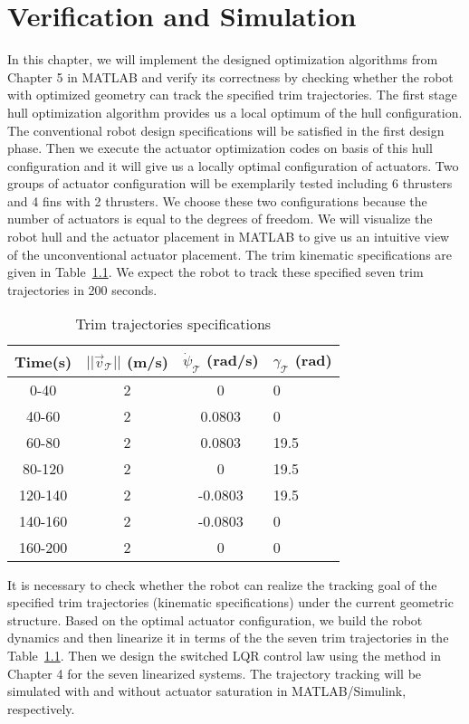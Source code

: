 \chapter{Verification and Simulation}
In this chapter, we will implement the designed optimization algorithms from Chapter 5 in MATLAB and verify its correctness by checking whether the robot with optimized geometry can track the specified trim trajectories. 
The first stage hull optimization algorithm provides us a local optimum of the hull configuration. The conventional robot design specifications will be satisfied in the first design phase. Then we execute the actuator optimization codes on basis of this hull configuration and it will give us a locally optimal configuration of actuators. Two groups of actuator configuration will be exemplarily tested including 6 thrusters and 4 fins with 2 thrusters. We choose these two configurations because the number of actuators is equal to the degrees of freedom. We will visualize the robot hull and the actuator placement in MATLAB to give us an intuitive view of the unconventional actuator placement.  
The trim kinematic specifications are given in Table~\ref{table:TrimValues}. 
We expect the robot to track these specified seven trim trajectories in 200 seconds. 
\begin{table}
\centering
\caption{Trim trajectories specifications}
\begin{tabular}{| c | c | c | p{2cm} |}
\hline
Time(s)&$||\vec{v}_{\mathcal{T}}||$ (m/s)&$\dot{\psi}_{\mathcal{T}}$ (rad/s)&$\gamma_{\mathcal{T}}$ (rad)\\ \hline
0-40&2&0&0\\ \hline
40-60&2&0.0803&0 \\ \hline
60-80&2&0.0803&19.5 \\ \hline
80-120&2&0&19.5 \\ \hline
120-140&2&-0.0803&19.5 \\ \hline
140-160&2&-0.0803&0 \\ \hline
160-200&2&0&0 \\ \hline
\end{tabular}
\label{table:TrimValues}
\end{table}  

It is necessary to check whether the robot can realize the tracking goal of the specified trim trajectories (kinematic specifications) under the current geometric structure. Based on the optimal actuator configuration, we build the robot dynamics and then linearize it in terms of the the seven trim trajectories in the Table~\ref{table:TrimValues}. Then we design the switched LQR control law using the method in Chapter 4 for the seven linearized systems. The trajectory tracking will be simulated with and without actuator saturation in MATLAB/Simulink, respectively.  

